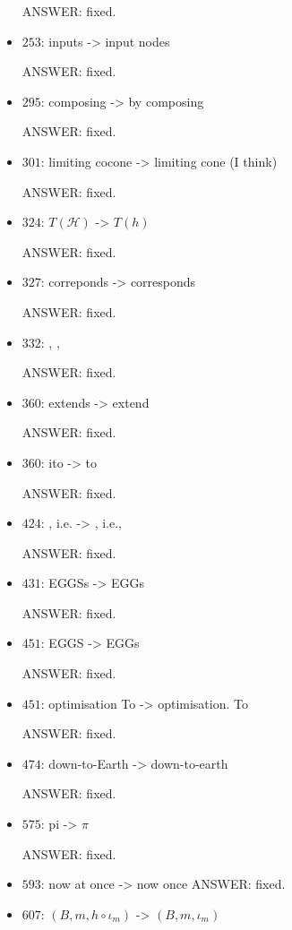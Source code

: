 \documentclass[english,11pt,a4paper]{article}
\begin{document}
\begin{itemize}
ANSWER: fixed.

\item $253$: inputs -> input nodes

ANSWER: fixed.

\item $295$: composing -> by composing

ANSWER: fixed.
\item $301$: limiting cocone -> limiting cone (I think)

ANSWER: fixed.


\item $324$: $T(\mathcal{H})$ -> $T(h)$

ANSWER: fixed.

\item $327$: correponds -> corresponds

ANSWER: fixed.

\item $332$: , ,

ANSWER: fixed.


\item $360$: extends -> extend

ANSWER: fixed.

\item $360$: ito -> to

ANSWER: fixed.

\item $424$: , i.e. -> , i.e.,

ANSWER: fixed.

\item $431$: EGGSs -> EGGs

ANSWER: fixed.

\item $451$: EGGS -> EGGs

ANSWER: fixed.

\item $451$: optimisation To -> optimisation. To

ANSWER: fixed.

\item $474$: down-to-Earth -> down-to-earth

ANSWER: fixed.

\item $575$: pi -> $\pi$

ANSWER: fixed.

\item $593$: now at once -> now once
ANSWER: fixed.
\item $607$: $(B,{m, h \circ \iota_m})$ -> $(B,{m,\iota_m})$


\end{itemize}
\end{document}
